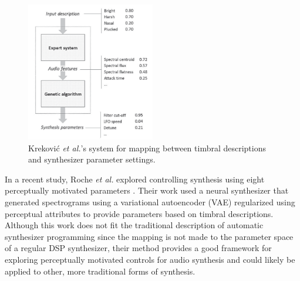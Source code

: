 \begin{figure}[ht]
    \centering
    \includegraphics[width=0.5\textwidth]{figures/background/krekovic-descriptive.png}
    \caption{Krekovi\'{c} \textit{et al.}'s \cite{krekovic2016algorithm} system for mapping between timbral descriptions and synthesizer parameter settings. }
    \label{fig:krekovic-desc}
\end{figure}



In a recent study, Roche \textit{et al.} explored controlling synthesis using eight perceptually motivated parameters \cite{roche2021make}. Their work used a neural synthesizer that generated spectrograms using a variational autoencoder (VAE) regularized using perceptual attributes to provide parameters based on timbral descriptions. Although this work does not fit the traditional description of automatic synthesizer programming since the mapping is not made to the parameter space of a regular DSP synthesizer, their method provides a good framework for exploring perceptually motivated controls for audio synthesis and could likely be applied to other, more traditional forms of synthesis.

